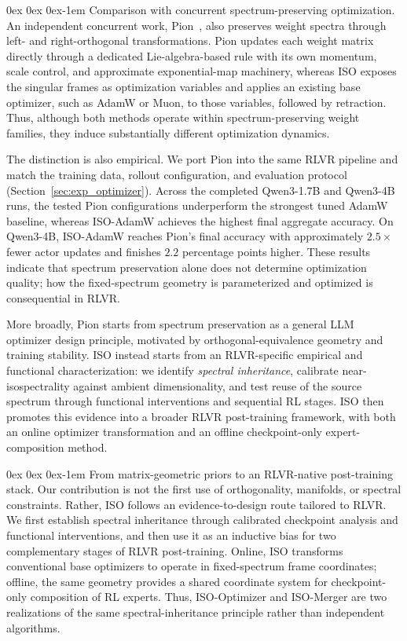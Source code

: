 \documentclass[11pt, a4paper]{utda}
\makeatletter
\renewcommand{\paragraph}{%
  \@startsection{paragraph}{4}%
  {\z@}{0ex \@plus 0ex \@minus 0ex}{-1em}%
  {\normalfont\normalsize\bfseries}%
}
\theoremstyle{plain}
\theoremstyle{definition}
\theoremstyle{remark}
\makeatother
\begin{document}
\paragraph{Comparison with concurrent spectrum-preserving optimization.}
An independent concurrent work, Pion~\cite{shi2026pion}, also preserves
weight spectra through left- and right-orthogonal transformations.
Pion updates each weight matrix directly through a dedicated
Lie-algebra-based rule with its own momentum, scale control, and
approximate exponential-map machinery, whereas ISO exposes the
singular frames as optimization variables and applies an existing base
optimizer, such as AdamW or Muon, to those variables, followed by
retraction.
Thus, although both methods operate within spectrum-preserving weight
families, they induce substantially different optimization dynamics.

The distinction is also empirical.
We port Pion into the same RLVR pipeline and match the training data,
rollout configuration, and evaluation protocol
(Section~\ref{sec:exp_optimizer}).
Across the completed Qwen3-1.7B and Qwen3-4B runs, the tested Pion
configurations underperform the strongest tuned AdamW baseline, whereas
ISO-AdamW achieves the highest final aggregate accuracy.
On Qwen3-4B, ISO-AdamW reaches Pion's final accuracy with approximately
$2.5\times$ fewer actor updates and finishes $2.2$ percentage points
higher.
These results indicate that spectrum preservation alone does not
determine optimization quality; how the fixed-spectrum geometry is
parameterized and optimized is consequential in RLVR.

More broadly, Pion starts from spectrum preservation as a general LLM
optimizer design principle, motivated by orthogonal-equivalence
geometry and training stability.
ISO instead starts from an RLVR-specific empirical and functional
characterization: we identify \emph{spectral inheritance}, calibrate
near-isospectrality against ambient dimensionality, and test reuse of
the source spectrum through functional interventions and sequential RL
stages.
ISO then promotes this evidence into a broader RLVR post-training
framework, with both an online optimizer transformation and an offline
checkpoint-only expert-composition method.

\paragraph{From matrix-geometric priors to an RLVR-native post-training stack.}
Our contribution is not the first use of orthogonality, manifolds, or
spectral constraints.
Rather, ISO follows an evidence-to-design route tailored to RLVR.
We first establish spectral inheritance through calibrated checkpoint
analysis and functional interventions, and then use it as an inductive
bias for two complementary stages of RLVR post-training.
Online, ISO transforms conventional base optimizers to operate in
fixed-spectrum frame coordinates; offline, the same geometry provides a
shared coordinate system for checkpoint-only composition of RL experts.
Thus, ISO-Optimizer and ISO-Merger are two realizations of the same
spectral-inheritance principle rather than independent algorithms.
\end{document}
